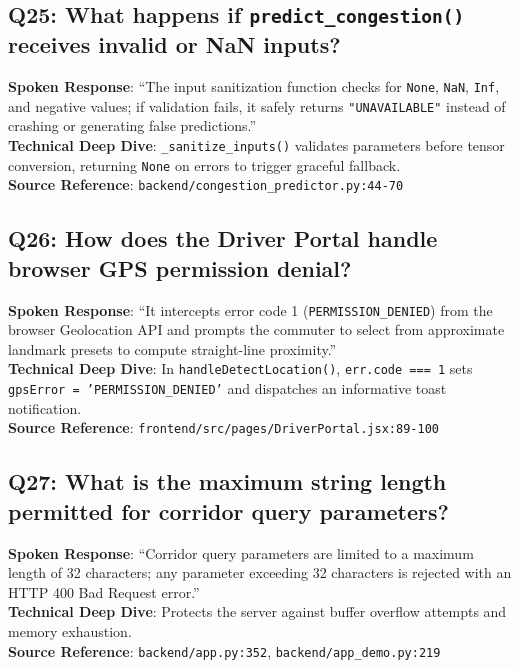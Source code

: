 \documentclass[11pt,a4paper,oneside]{report}
\begin{document}
\subsection*{Q25: What happens if \texttt{predict\_congestion()} receives invalid or NaN inputs?}
\begin{interviewbox}
\textbf{Spoken Response}: ``The input sanitization function checks for \texttt{None}, \texttt{NaN}, \texttt{Inf}, and negative values; if validation fails, it safely returns \texttt{"UNAVAILABLE"} instead of crashing or generating false predictions.''\\
\textbf{Technical Deep Dive}: \texttt{\_sanitize\_inputs()} validates parameters before tensor conversion, returning \texttt{None} on errors to trigger graceful fallback.\\
\textbf{Source Reference}: \texttt{backend/congestion\_predictor.py:44-70}
\end{interviewbox}

\subsection*{Q26: How does the Driver Portal handle browser GPS permission denial?}
\begin{interviewbox}
\textbf{Spoken Response}: ``It intercepts error code 1 (\texttt{PERMISSION\_DENIED}) from the browser Geolocation API and prompts the commuter to select from approximate landmark presets to compute straight-line proximity.''\\
\textbf{Technical Deep Dive}: In \texttt{handleDetectLocation()}, \texttt{err.code === 1} sets \texttt{gpsError = 'PERMISSION\_DENIED'} and dispatches an informative toast notification.\\
\textbf{Source Reference}: \texttt{frontend/src/pages/DriverPortal.jsx:89-100}
\end{interviewbox}

\subsection*{Q27: What is the maximum string length permitted for corridor query parameters?}
\begin{interviewbox}
\textbf{Spoken Response}: ``Corridor query parameters are limited to a maximum length of 32 characters; any parameter exceeding 32 characters is rejected with an HTTP 400 Bad Request error.''\\
\textbf{Technical Deep Dive}: Protects the server against buffer overflow attempts and memory exhaustion.\\
\textbf{Source Reference}: \texttt{backend/app.py:352}, \texttt{backend/app\_demo.py:219}
\end{interviewbox}
\end{document}
